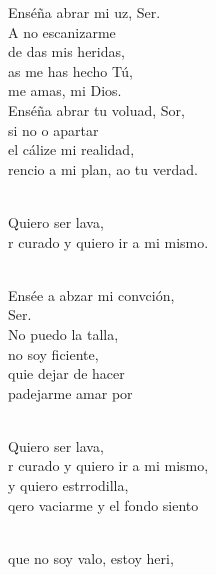 \begin{cancion}[Resucitados][]%
	Enséña abrar mi uz, Ser. \\
	A no escanizarme \\
	de das mis heridas, \\
	as me has hecho Tú, \\
	 me amas, mi Dios.  \\
	Enséña abrar tu voluad, Sor,  \\
	si no o apartar \\
	el cálize mi realidad, \\
	rencio a mi plan, ao tu verdad. \\\jump\\
	\begin{chorus}%
	Quiero  ser lava, \\
	r curado y quiero ir a mi mismo. \\
	\end{chorus}%
	\jump\\
	Ensée a abzar mi convción, \\
	Ser. \\
	No puedo la talla, \\
	no soy ficiente, \\
	quie dejar de hacer \\
	padejarme amar por  \\\jump\\
	\begin{chorus}%
	Quiero  ser lava, \\
	r curado y quiero ir a mi mismo, \\
	y quiero estrrodilla,  \\
	qero vaciarme y el fondo siento\\
	\end{chorus}%
	\jump\\
	que no soy valo, estoy heri, \\

\end{cancion}
